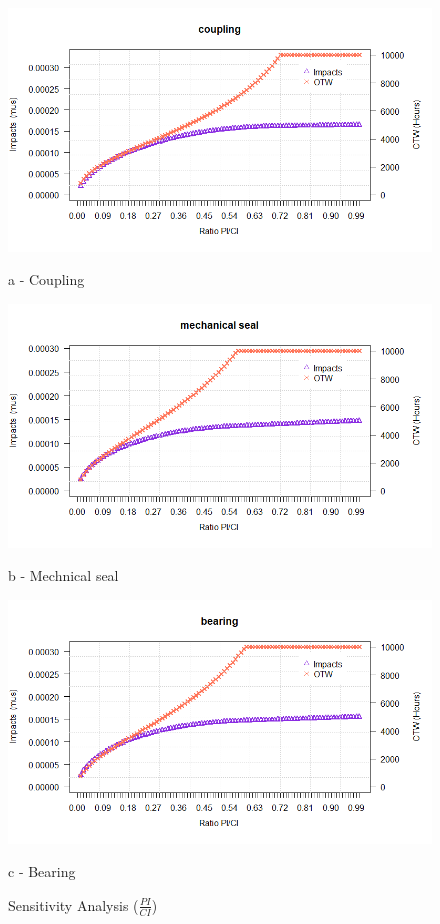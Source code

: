 \begin{figure}[!htb]
	\begin{minipage}[b]{0.5\linewidth}
		\centering
		\includegraphics[width=\textwidth]{figures/ch05_fig_sapici_coupling}
		\caption*{a - Coupling}
	\end{minipage}
	\hspace{0.05cm}
	\begin{minipage}[b]{0.5\linewidth}
		\centering
		\includegraphics[width=\textwidth]{figures/ch05_fig_sapici_mechseal}
		\caption*{b - Mechnical seal}
	\end{minipage}
	\hspace{0.05cm}
	\begin{minipage}[b]{0.5\linewidth}
		\centering
		\includegraphics[width=\textwidth]{figures/ch05_fig_sapici_bearing}
		\caption*{c - Bearing}
	\end{minipage}
	\caption{Sensitivity Analysis ($\frac{PI}{CI}$)}
	\label{ch05_fig_sa_pici}
\end{figure}